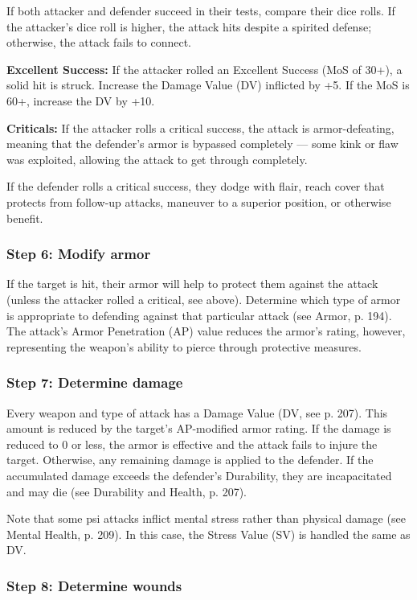 If both attacker and defender succeed in their tests, compare their dice rolls. If the attacker’s dice roll is higher, the attack hits despite a spirited defense; otherwise, the attack fails to connect. 

\textbf{Excellent Success:} If the attacker rolled an Excellent Success (MoS of 30+), a solid hit is struck. Increase the Damage Value (DV) inflicted by +5. If the MoS is 60+, increase the DV by +10. 

\textbf{Criticals:} If the attacker rolls a critical success, the attack is armor-defeating, meaning that the defender’s armor is bypassed completely --- some kink or flaw was exploited, allowing the attack to get through completely. 

If the defender rolls a critical success, they dodge with flair, reach cover that protects from follow-up attacks, maneuver to a superior position, or otherwise benefit. 

\subsubsection{Step 6: Modify armor} 

If the target is hit, their armor will help to protect them against the attack (unless the attacker rolled a critical, see above). Determine which type of armor is appropriate to defending against that particular attack (see Armor, p. 194). The attack’s Armor Penetration (AP) value reduces the armor’s rating, however, representing the weapon’s ability to pierce through protective measures. 

\subsubsection{Step 7: Determine damage} 

Every weapon and type of attack has a Damage Value (DV, see p. 207). This amount is reduced by the target’s AP-modified armor rating. If the damage is reduced to 0 or less, the armor is effective and the attack fails to injure the target. Otherwise, any remaining damage is applied to the defender. If the accumulated damage exceeds the defender’s Durability, they are incapacitated and may die (see Durability and Health, p. 207). 

Note that some psi attacks inflict mental stress rather than physical damage (see Mental Health, p. 209). In this case, the Stress Value (SV) is handled the same as DV. 

\subsubsection{Step 8: Determine wounds} 

